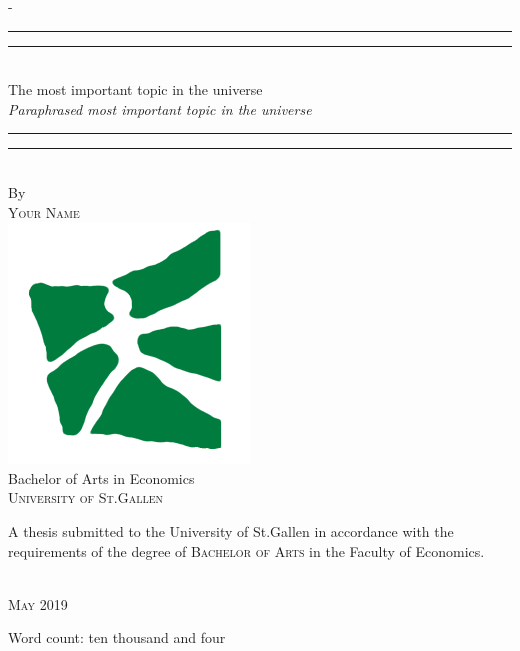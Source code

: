 %
%

\begin{titlingpage}
\begin{SingleSpace}
\calccentering{\unitlength} 
\begin{adjustwidth*}{\unitlength}{-\unitlength}
\vspace*{13mm}
\begin{center}
\rule[0.5ex]{\linewidth}{2pt}\vspace*{-\baselineskip}\vspace*{3.2pt}
\rule[0.5ex]{\linewidth}{1pt}\\[\baselineskip]
{\HUGE The most important topic in the universe}\\[4mm]
{\Large \textit{Paraphrased most important topic in the universe}}\\
\rule[0.5ex]{\linewidth}{1pt}\vspace*{-\baselineskip}\vspace{3.2pt}
\rule[0.5ex]{\linewidth}{2pt}\\
\vspace{6.5mm}
{\large By}\\
\vspace{6.5mm}
{\large\textsc{Your Name}}\\
\vspace{11mm}
\includegraphics[scale=0.6]{logos/unisg}\\
\vspace{6mm}
{\large Bachelor of Arts in Economics\\
\textsc{University of St.Gallen}}\\
\vspace{11mm}
\begin{minipage}{10cm}
A thesis submitted to the University of St.Gallen in accordance with the requirements of the degree of \textsc{Bachelor of Arts} in the Faculty of Economics.
\end{minipage}\\
\vspace{9mm}
{\large\textsc{May 2019}}
\vspace{12mm}
\end{center}
\begin{flushright}
{\small Word count: ten thousand and four}
\end{flushright}
\end{adjustwidth*}
\end{SingleSpace}
\end{titlingpage}